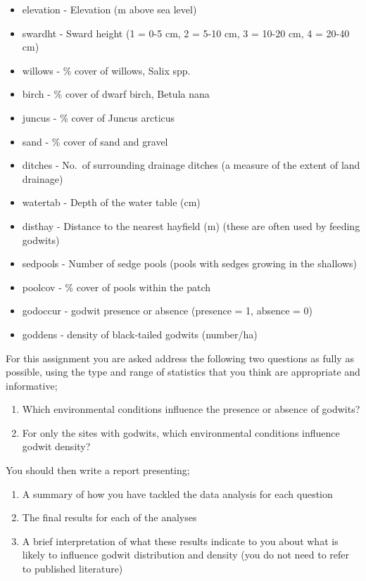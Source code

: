 \documentclass[
]{book}
\providecommand{\tightlist}{%
  \setlength{\itemsep}{0pt}\setlength{\parskip}{0pt}}
\begin{document}
\begin{itemize}
\tightlist
\item
  elevation - Elevation (m above sea level)
\item
  swardht - Sward height (1 = 0-5 cm, 2 = 5-10 cm, 3 = 10-20 cm, 4 = 20-40 cm)
\item
  willows - \% cover of willows, Salix spp.
\item
  birch - \% cover of dwarf birch, Betula nana
\item
  juncus - \% cover of Juncus arcticus
\item
  sand - \% cover of sand and gravel
\item
  ditches - No.~of surrounding drainage ditches (a measure of the extent of land drainage)
\item
  watertab - Depth of the water table (cm)
\item
  disthay - Distance to the nearest hayfield (m) (these are often used by feeding godwits)
\item
  sedpools - Number of sedge pools (pools with sedges growing in the shallows)
\item
  poolcov - \% cover of pools within the patch
\item
  godoccur - godwit presence or absence (presence = 1, absence = 0)
\item
  goddens - density of black-tailed godwits (number/ha)
\end{itemize}

For this assignment you are asked address the following two questions as fully as possible, using the type and range of statistics that you think are appropriate and informative;

\begin{enumerate}
\def\labelenumi{\arabic{enumi})}
\item
  Which environmental conditions influence the presence or absence of godwits?
\item
  For only the sites with godwits, which environmental conditions influence godwit density?
\end{enumerate}

You should then write a report presenting;

\begin{enumerate}
\def\labelenumi{\arabic{enumi})}
\tightlist
\item
  A summary of how you have tackled the data analysis for each question
\item
  The final results for each of the analyses
\item
  A brief interpretation of what these results indicate to you about what is likely to influence godwit distribution and density (you do not need to refer to published literature)
\end{enumerate}
\end{document}
